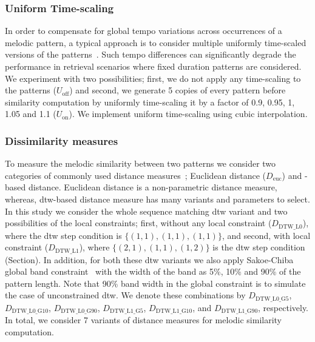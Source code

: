 \subsubsection{Uniform Time-scaling}
\label{sec:patterns_melodic_similarity_time_scaling}

In order to compensate for global tempo variations across occurrences of a melodic pattern, a typical approach is to consider multiple uniformly time-scaled versions of the patterns~\citep{mazzoni2001melody, kotsifakos2012survey}. Such tempo differences can significantly degrade the performance in retrieval scenarios where fixed duration patterns are considered. We experiment with two possibilities; first,  we do not apply any time-scaling to the patterns ($U_{\mathrm{off}}$) and second, we generate 5 copies of every pattern before similarity computation by uniformly time-scaling it by a factor of 0.9, 0.95, 1, 1.05 and 1.1 ($U_{\mathrm{on}}$). We implement uniform time-scaling using cubic interpolation. 

\subsubsection{Dissimilarity measures}
\label{sec:patterns_melodic_similarity_dissimilarity measures}

To measure the melodic similarity between two patterns we consider two categories of commonly used distance measures~\cite{Ross2012b, Rao2014, muller2007information}; Euclidean distance ($D_{\mathrm{euc}}$) and -based distance. Euclidean distance is a non-parametric distance measure, whereas, \gls{dtw}-based distance measure has many variants and parameters to select. In this study we consider the whole sequence matching \gls{dtw} variant and two possibilities of the local constraints; first, without any local constraint ($D_{\mathrm{DTW\_L0}}$), where the \gls{dtw} step condition is $\lbrace(1,1), (1,1), (1,1)\rbrace$, and second, with local constraint ($D_{\mathrm{DTW\_L1}}$), where $\lbrace(2,1), (1,1), (1,2)\rbrace$ is the \gls{dtw} step condition (Section). In addition, for both these \gls{dtw} variants we also apply Sakoe-Chiba global band constraint~\cite{Sakoe78TASLP} with the width of the band as 5\%, 10\% and 90\% of the pattern length. Note that 90\% band width in the global constraint is to simulate the case of unconstrained \gls{dtw}. We denote these combinations by $D_{\mathrm{DTW\_L0\_G5}}$, $D_{\mathrm{DTW\_L0\_G10}}$, $D_{\mathrm{DTW\_L0\_G90}}$, $D_{\mathrm{DTW\_L1\_G5}}$, $D_{\mathrm{DTW\_L1\_G10}}$, and $D_{\mathrm{DTW\_L1\_G90}}$, respectively. In total, we consider 7 variants of distance measures for melodic similarity computation.

